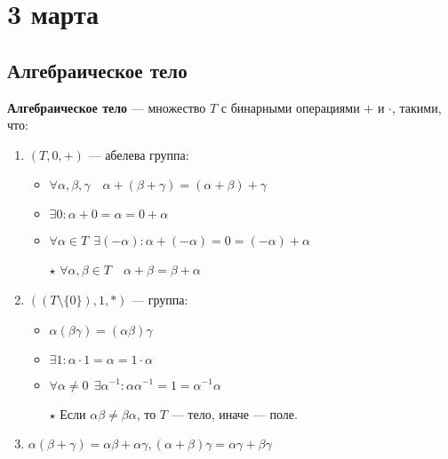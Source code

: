 \chapter{3 марта}

\section{Алгебраическое тело}

\begin{definition}
    \textbf{Алгебраическое тело} --- множество \(T\) с бинарными операциями \(+\) и \(\cdot\), такими, что:
    \begin{enumerate}
        \item \((T, 0, +)\) --- абелева группа:
        \begin{itemize}
            \item \(\forall \alpha, \beta, \gamma \quad \alpha + (\beta + \gamma) = (\alpha + \beta) + \gamma\)
            \item \(\exists 0 : \alpha + 0 = \alpha = 0 + \alpha\)
            \item \(\forall \alpha \in T \ \ \exists ( - \alpha) : \alpha + ( - \alpha) = 0 = ( - \alpha) + \alpha\)
            \item[\(\star\)] \(\forall \alpha, \beta \in T \quad \alpha + \beta = \beta + \alpha\)
        \end{itemize}
        \item \(((T \setminus \{0\}), 1, *)\) --- группа:
        \begin{itemize}
            \item \(\alpha (\beta \gamma) = (\alpha \beta) \gamma\)
            \item \(\exists 1 : \alpha \cdot 1 = \alpha = 1 \cdot \alpha\)
            \item \(\forall \alpha \neq 0 \ \ \exists \alpha^{-1} : \alpha\alpha^{-1} = 1 = \alpha^{-1}\alpha\)
            \item[\(\star\)] Если \(\alpha\beta\neq\beta\alpha\), то \(T\) --- тело, иначе --- поле.
        \end{itemize}
        \item \(\alpha(\beta + \gamma) = \alpha\beta + \alpha\gamma, (\alpha + \beta)\gamma = \alpha \gamma + \beta\gamma\)
    \end{enumerate}
\end{definition}

